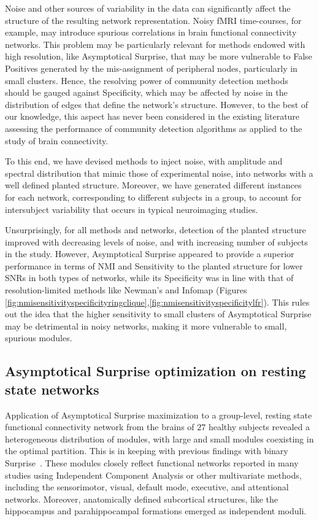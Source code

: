 Noise and other sources of variability in the data can significantly affect the structure of the resulting network representation.
Noisy fMRI time-courses, for example, may introduce spurious correlations in brain functional connectivity networks.
This problem may be particularly relevant for methods endowed with high resolution, like Asymptotical Surprise, that may be more vulnerable to False Positives generated by the mis-assignment of peripheral nodes, particularly in small clusters. Hence, the resolving power of community detection methods should be gauged against Specificity, which may be affected by noise in the distribution of edges that define the network's structure.
However, to the best of our knowledge, this aspect has never been considered in the existing literature assessing the performance of community detection algorithms as applied to the study of brain connectivity.

To this end, we have devised methods to inject noise, with amplitude and spectral distribution that mimic those of experimental noise, into networks with a well defined planted structure. Moreover, we have generated different instances for each network, corresponding to different subjects in a group, to account for intersubject variability that occurs in typical neuroimaging studies. 

Unsurprisingly, for all methods and networks, detection of the planted structure improved with decreasing levels of noise, and with increasing number of subjects in the study.
However, Asymptotical Surprise appeared to provide a superior performance in terms of NMI and Sensitivity to the planted structure for lower SNRs in both types of networks, while its Specificity was in line with that of resolution-limited methods like Newman's and Infomap (Figures \ref{fig:nmisensitivityspecificityringclique},\ref{fig:nmisensitivityspecificitylfr}).
This rules out the idea that the higher sensitivity to small clusters of Asymptotical Surprise may be detrimental in noisy networks, making it more vulnerable to small, spurious modules.

\subsection{Asymptotical Surprise optimization on resting state networks}
Application of Asymptotical Surprise maximization to a group-level, resting state functional connectivity network from the brains of $27$ healthy subjects revealed a heterogeneous distribution of modules, with large and small modules coexisting in the optimal partition.
This is in keeping with previous findings with binary Surprise~\cite{nicolini2016}.
These modules closely reflect functional networks reported in many studies using Independent Component Analysis or other multivariate methods, including the sensorimotor, visual, default mode, executive, and attentional networks.
Moreover, anatomically defined subcortical structures, like the hippocampus and parahippocampal formations emerged as independent moduli.

